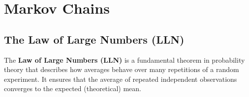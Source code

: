 \chapter{Markov Chains}

\section{The Law of Large Numbers (LLN)}

The \textbf{Law of Large Numbers (LLN)} is a fundamental theorem in probability theory that describes how averages behave over many repetitions of a random experiment. It ensures that the average of repeated independent observations converges to the expected (theoretical) mean.

